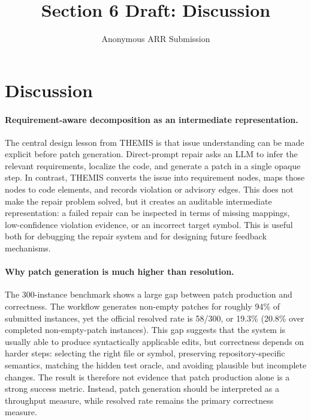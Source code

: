 \documentclass[11pt]{article}
\title{Section 6 Draft: Discussion}
\author{Anonymous ARR Submission}
\begin{document}
\maketitle

\section{Discussion}
\label{sec:discussion}

\paragraph{Requirement-aware decomposition as an intermediate representation.}
The central design lesson from THEMIS is that issue understanding can be made explicit before patch generation.  Direct-prompt repair asks an LLM to infer the relevant requirements, localize the code, and generate a patch in a single opaque step.  In contrast, THEMIS converts the issue into requirement nodes, maps those nodes to code elements, and records violation or advisory edges.  This does not make the repair problem solved, but it creates an auditable intermediate representation: a failed repair can be inspected in terms of missing mappings, low-confidence violation evidence, or an incorrect target symbol.  This is useful both for debugging the repair system and for designing future feedback mechanisms.

\paragraph{Why patch generation is much higher than resolution.}
The 300-instance benchmark shows a large gap between patch production and correctness.  The workflow generates non-empty patches for roughly 94\% of submitted instances, yet the official resolved rate is 58/300, or 19.3\% (20.8\% over completed non-empty-patch instances).  This gap suggests that the system is usually able to produce syntactically applicable edits, but correctness depends on harder steps: selecting the right file or symbol, preserving repository-specific semantics, matching the hidden test oracle, and avoiding plausible but incomplete changes.  The result is therefore not evidence that patch production alone is a strong success metric.  Instead, patch generation should be interpreted as a throughput measure, while resolved rate remains the primary correctness measure.
\end{document}
